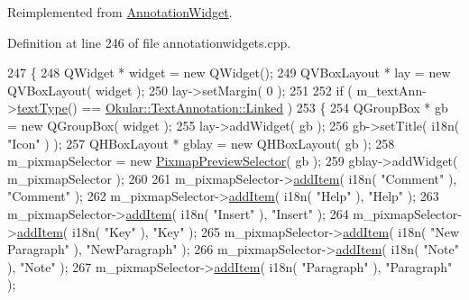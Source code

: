 Reimplemented from \hyperlink{classAnnotationWidget_a4b0926d20f0b26deb5b6a4e75f78fac3}{Annotation\+Widget}.



Definition at line 246 of file annotationwidgets.\+cpp.


\begin{DoxyCode}
247 \{
248     QWidget * widget = \textcolor{keyword}{new} QWidget();
249     QVBoxLayout * lay = \textcolor{keyword}{new} QVBoxLayout( widget );
250     lay->setMargin( 0 );
251 
252     \textcolor{keywordflow}{if} ( m\_textAnn->\hyperlink{classOkular_1_1TextAnnotation_acf75a9a22542d3008a486298972e6dcf}{textType}() == \hyperlink{classOkular_1_1TextAnnotation_af560204454bf812797bc95bea730b06eaf7d7133e8e4850bf030e108537a9887b}{Okular::TextAnnotation::Linked} )
253     \{
254         QGroupBox * gb = \textcolor{keyword}{new} QGroupBox( widget );
255         lay->addWidget( gb );
256         gb->setTitle( i18n( \textcolor{stringliteral}{"Icon"} ) );
257         QHBoxLayout * gblay = \textcolor{keyword}{new} QHBoxLayout( gb );
258         m\_pixmapSelector = \textcolor{keyword}{new} \hyperlink{classPixmapPreviewSelector}{PixmapPreviewSelector}( gb );
259         gblay->addWidget( m\_pixmapSelector );
260 
261         m\_pixmapSelector->\hyperlink{classPixmapPreviewSelector_ac4729c46cc585aba462dd2eebcb74a92}{addItem}( i18n( \textcolor{stringliteral}{"Comment"} ), \textcolor{stringliteral}{"Comment"} );
262         m\_pixmapSelector->\hyperlink{classPixmapPreviewSelector_ac4729c46cc585aba462dd2eebcb74a92}{addItem}( i18n( \textcolor{stringliteral}{"Help"} ), \textcolor{stringliteral}{"Help"} );
263         m\_pixmapSelector->\hyperlink{classPixmapPreviewSelector_ac4729c46cc585aba462dd2eebcb74a92}{addItem}( i18n( \textcolor{stringliteral}{"Insert"} ), \textcolor{stringliteral}{"Insert"} );
264         m\_pixmapSelector->\hyperlink{classPixmapPreviewSelector_ac4729c46cc585aba462dd2eebcb74a92}{addItem}( i18n( \textcolor{stringliteral}{"Key"} ), \textcolor{stringliteral}{"Key"} );
265         m\_pixmapSelector->\hyperlink{classPixmapPreviewSelector_ac4729c46cc585aba462dd2eebcb74a92}{addItem}( i18n( \textcolor{stringliteral}{"New Paragraph"} ), \textcolor{stringliteral}{"NewParagraph"} );
266         m\_pixmapSelector->\hyperlink{classPixmapPreviewSelector_ac4729c46cc585aba462dd2eebcb74a92}{addItem}( i18n( \textcolor{stringliteral}{"Note"} ), \textcolor{stringliteral}{"Note"} );
267         m\_pixmapSelector->\hyperlink{classPixmapPreviewSelector_ac4729c46cc585aba462dd2eebcb74a92}{addItem}( i18n( \textcolor{stringliteral}{"Paragraph"} ), \textcolor{stringliteral}{"Paragraph"} );

\end{DoxyCode}
